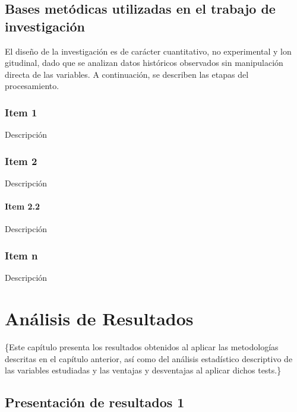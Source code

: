 \documentclass[oneside,11pt]{Latex/Classes/PhDthesisPSnPDF}
\begin{document}
\section{Bases metódicas utilizadas en el trabajo de investigación}

El diseño de la investigación es de carácter cuantitativo, no
experimental y lon gitudinal, dado que se analizan datos históricos
observados sin manipulación directa de las variables. A continuación, se
describen las etapas del procesamiento.\\

\subsection{Item 1}

Descripción\\

\subsection{Item 2}

Descripción\\

\subsubsection{Item 2.2}

Descripción\\

\subsection{Item n}

Descripción\\

\chapter{Análisis de Resultados}

\{\small Este capítulo presenta los resultados obtenidos al aplicar las
metodologías descritas en el capítulo anterior, así como del análisis
estadístico descriptivo de las variables estudiadas y las ventajas y
desventajas al aplicar dichos tests.\}

\section{Presentación de resultados 1}
\end{document}
